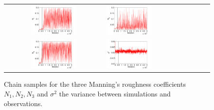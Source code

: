 \begin{figure}[h]
\begin{tabular}{clc}
\includegraphics[width=0.475\textwidth]{./figures/chain_p1.pdf} &
\includegraphics[width=0.475\textwidth]{./figures/chain_p2.pdf} \\
\includegraphics[width=0.475\textwidth]{./figures/chain_p3.pdf} &
\includegraphics[width=0.475\textwidth]{./figures/chain_s1.pdf}
\end{tabular}
\caption{Chain samples for the three Manning's roughness coefficients $N_1,N_2,N_3$ and $\sigma^2$
the variance between simulations and observations.}
\label{fig:mcmc} 
\end{figure}

